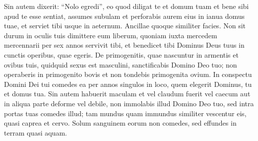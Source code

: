 \begin{biblechapter}
\begin{biblechapter}
\begin{biblechapter}
\begin{biblechapter}
\begin{biblechapter}
\begin{biblechapter}
\begin{biblechapter}
\begin{biblechapter}
\begin{biblechapter}
\begin{biblechapter}
\begin{biblechapter}
\begin{biblechapter}
\begin{biblechapter}
\begin{biblechapter}
\begin{biblechapter}
\verse Sin autem dixerit: “Nolo egredi”, eo quod diligat te et domum tuam et bene sibi apud te esse sentiat, 
 \verse assumes subulam et perforabis aurem eius in ianua domus tuae, et serviet tibi usque in aeternum. Ancillae quoque similiter facies. 
\verse Non sit durum in oculis tuis dimittere eum liberum, quoniam iuxta mercedem mercennarii per sex annos servivit tibi, et benedicet tibi Dominus Deus tuus in cunctis operibus, quae egeris.
 \verse De primogenitis, quae nascuntur in armentis et ovibus tuis, quidquid sexus est masculini, sanctificabis Domino Deo tuo; non operaberis in primogenito bovis et non tondebis primogenita ovium. 
\verse In conspectu Domini Dei tui comedes ea per annos singulos in loco, quem elegerit Dominus, tu et domus tua. 
\verse Sin autem habuerit maculam et vel claudum fuerit vel caecum aut in aliqua parte deforme vel debile, non immolabis illud Domino Deo tuo, 
\verse sed intra portas tuas comedes illud; tam mundus quam immundus similiter vescentur eis, quasi caprea et cervo. 
\verse Solum sanguinem eorum non comedes, sed effundes in terram quasi aquam.
 

\end{biblechapter}
\end{biblechapter}
\end{biblechapter}
\end{biblechapter}
\end{biblechapter}
\end{biblechapter}
\end{biblechapter}
\end{biblechapter}
\end{biblechapter}
\end{biblechapter}
\end{biblechapter}
\end{biblechapter}
\end{biblechapter}
\end{biblechapter}
\end{biblechapter}
